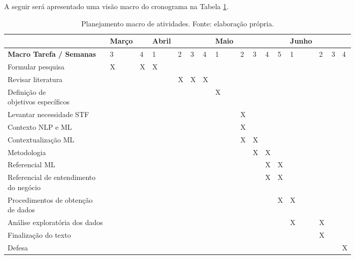 A seguir será apresentado uma visão macro do cronograma na Tabela \ref{tab:cronograma}.
\begin{table}[h]
	\centering    
	\caption{Planejamento macro de atividades. Fonte: elaboração própria.}
    \label{tab:cronograma}
	\begin{tabular}{|l|p{}p{0.4cm}|p{0.4cm}p{0.4cm}p{0.4cm}p{0.4cm}|p{0.4cm}p{0.4cm}p{0.4cm}p{0.4cm}p{0.4cm}|p{0.4cm}p{0.4cm}p{0.4cm}p{0.4cm}|}
    	\hline
		& Março & & Abril & & & & Maio & & & & & Junho & & &  \\ \hline
\textbf{Macro Tarefa / Semanas} & 3 & 4 & 1 & 2 & 3 & 4 & 1 & 2 & 3 & 4 & 5 & 1 & 2 & 3 & 4 \\ \hline
Formular pesquisa                              & X & X & X &   &   &   &   &   &   &   &   &   &   &   &   \\ \hline
Revisar literatura                             &   &   &   & X & X & X &   &   &   &   &   &   &   &   &   \\ \hline
\makecell[l]{Definição de \\ objetivos específicos}             &   &   &   &   &   &   & X &   &   &   &   &   &   &   &   \\ \hline
Levantar necessidade STF                       &   &   &   &   &   &   &   & X &   &   &   &   &   &   &   \\ \hline
Contexto NLP e ML                              &   &   &   &   &   &   &   & X &   &   &   &   &   &   &   \\ \hline
Contextualização ML              &   &   &   &   &   &   &   & X & X &   &   &   &   &   &   \\ \hline
Metodologia                                    &   &   &   &   &   &   &   &   & X & X &   &   &   &   &   \\ \hline
Referencial ML              &   &   &   &   &   &   &   &   &   & X & X &   &   &   &   \\ \hline
\makecell[l]{Referencial de entendimento \\ do negócio} &   &   &   &   &   &   &   &   &   & X & X &   &   &   &   \\ \hline
\makecell[l]{Procedimentos de obtenção\\ de dados}             &   &   &   &   &   &   &   &   &   &   & X & X &   &   &   \\ \hline
Análise exploratória dos dados                 &   &   &   &   &   &   &   &   &   &   &   & X & X &   &   \\ \hline
Finalização do texto      &   &   &   &   &   &   &   &   &   &   &   &   & X &   &   \\ \hline
Defesa                                         &   &   &   &   &   &   &   &   &   &   &   &   &   &   & X \\ \hline
	\end{tabular}
\end{table}